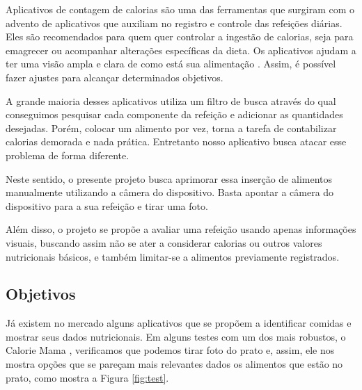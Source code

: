 Aplicativos de contagem de calorias são uma das ferramentas que surgiram com o advento de aplicativos que auxiliam no registro e controle das refeições diárias. Eles são recomendados para quem quer controlar a ingestão de calorias, seja para emagrecer ou acompanhar alterações específicas da dieta. Os aplicativos ajudam a ter uma visão ampla e clara de como está sua alimentação \cite{payne2015behavioral}. Assim, é possível fazer ajustes para alcançar determinados objetivos. 

A grande maioria desses aplicativos utiliza um filtro de busca através do qual conseguimos pesquisar cada componente da refeição e adicionar as quantidades desejadas. Porém, colocar um alimento por vez, torna a tarefa de contabilizar calorias demorada e nada prática. Entretanto nosso aplicativo busca atacar esse problema de forma diferente.


Neste sentido, o presente projeto busca aprimorar essa inserção de alimentos manualmente utilizando a câmera do dispositivo. Basta apontar a câmera do dispositivo para a sua refeição e tirar uma foto. 

Além disso, o projeto se propõe a avaliar uma refeição usando apenas informações visuais, buscando assim não se ater a considerar calorias ou outros valores nutricionais básicos, e também limitar-se a alimentos previamente registrados.


\subsection{Objetivos}

Já existem no mercado alguns aplicativos que se propõem a identificar comidas e mostrar seus dados nutricionais.
Em alguns testes com um dos mais robustos, o Calorie Mama \cite{caloriemama_2016}, verificamos que podemos tirar foto do prato e, assim, ele nos mostra opções que se pareçam mais relevantes dados os alimentos que estão no prato, como mostra a Figura \ref{fig:test}.

